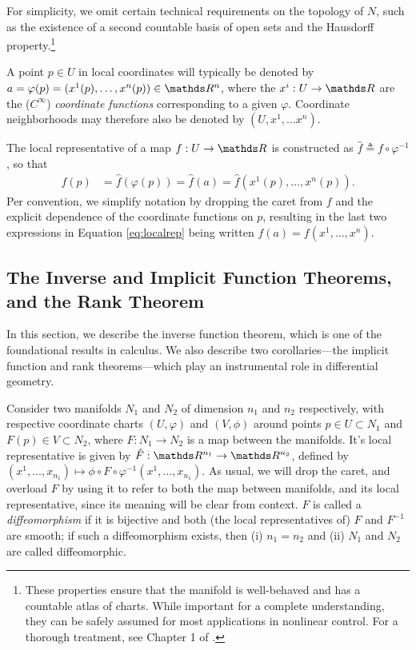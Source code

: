\begin{remark}
For simplicity, we omit certain technical requirements on the topology of $N$, such as the existence of a second countable basis of open sets and the Hausdorff property.\footnote{These properties ensure that the manifold is well-behaved and has a countable atlas of charts. While important for a complete understanding, they can be safely assumed for most applications in nonlinear control. For a thorough treatment, see Chapter 1 of \cite{abraham_manifolds_1988}.}
\end{remark}

A point $p\in U$ in local coordinates will typically be denoted by $a = \varphi (p) = (x^1(p), \dots, x^n(p)) \in \R^n$, where the $x^i: U \rightarrow \R$ are the ($C^{\infty}$) \textit{coordinate functions} corresponding to a given $\varphi$. Coordinate neighborhoods may therefore also be denoted by $(U, x^1, \dots x^n)$. 

The local representative of a map $f:U\rightarrow \R$ is constructed as $\hat f \triangleq f\circ \varphi^{-1}$, so that 
\begin{align}\label{eq:localrep}
f(p) & = \hat f(\varphi(p)) =\hat f(a) = \hat f(x^1(p), \dots, x^n(p)).
\end{align}
Per convention, we simplify notation by dropping the caret from $f$ and the explicit dependence of the coordinate functions on $p$, resulting in the last two expressions in Equation \ref{eq:localrep} being written $f(a) = f(x^1, \dots, x^n)$. 

\subsection{The Inverse and Implicit Function Theorems, and the Rank Theorem}
In this section, we describe the inverse function theorem, which is one of the foundational results in calculus. We also describe two corollaries---the implicit function and rank theorems---which play an instrumental role in differential geometry. 

Consider two manifolds $N_1$ and $N_2$ of dimension $n_1$ and $n_2$ respectively, with respective coordinate charts $(U, \varphi)$ and $(V, \phi)$ around points $p\in U\subset N_1$ and $F(p)\in V \subset N_2$, where $F:N_1 \rightarrow N_2$ is a map between the manifolds. It's local representative is given by $\hat F: \R^{n_1}\rightarrow \R^{n_2}$, defined by $(x^1, \dots, x_{n_1}) \mapsto \phi \circ F\circ \varphi^{-1}(x^1, \dots, x_{n_1})$. As usual, we will drop the caret, and overload $F$ by using it to refer to both the map between manifolds, and its local representative, since its meaning will be clear from context. $F$ is called a \textit{diffeomorphism} if it is bijective and both (the local representatives of) $F$ and $F^{-1}$ are smooth; if such a diffeomorphism exists, then (i) $n_1=n_2$ and (ii) $N_1$ and $N_2$ are called diffeomorphic. %

